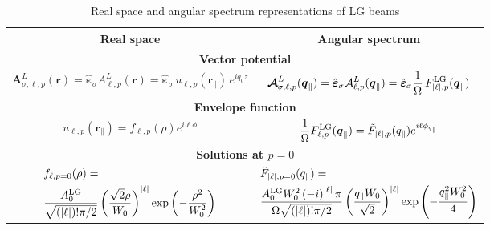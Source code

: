 \begin{table}[H]
\color{G}
\centering
\caption{Real space and angular spectrum representations of LG beams}
\label{tab:my_formulas}

\begin{tabular}{|c|c|}
\hline
\textbf{Real space} & \textbf{Angular spectrum} \\ \hline

\hline
\multicolumn{2}{|c|}{\textbf{Vector potential}} \\ \hline
\rule[-2.5ex]{0pt}{6.5ex} %
$\displaystyle \boldsymbol{A}^{L}_{\sigma, \ell, p}(\boldsymbol{r})
=
\hat{\boldsymbol{\varepsilon}}_\sigma A^{L}_{\ell, p}(\boldsymbol{r})
=
\hat{\boldsymbol{\varepsilon}}_\sigma
\, u_{\ell, p}(\boldsymbol{r}_\parallel)
\, e^{i q_0 z}$
&
$\displaystyle \boldsymbol{\mathcal{A}}^L_{\sigma, \ell, p}(\boldsymbol{q}_\parallel)
=
\hat{\boldsymbol{\varepsilon}}_\sigma \mathcal{A}^L_{\ell, p}(\boldsymbol{q}_\parallel)
=
\hat{\boldsymbol{\varepsilon}}_\sigma
\frac{1}{\Omega}
\, F_{|\ell|, p}^{\rm LG}(\boldsymbol{q}_\parallel)$ \\ \hline

\hline
\multicolumn{2}{|c|}{\textbf{Envelope function}} \\ \hline
\rule[-2.5ex]{0pt}{6.5ex}
$\displaystyle u_{\ell, p}(\boldsymbol{r}_\parallel)
=
f_{\ell, p}(\rho)e^{i \ell \phi}$
&
$\displaystyle \frac{1}{\Omega}F_{\ell, p}^{\rm LG}(\boldsymbol{q}_\parallel)
=
\tilde{F}_{\left|\ell\right|, p}(q_\parallel)e^{i \ell \phi_{q_\parallel}}$ \\ \hline

\hline
\multicolumn{2}{|c|}{\textbf{Solutions at $p=0$}} \\ \hline
\rule[-6ex]{0pt}{13ex} %
$\begin{aligned} 
&\displaystyle f_{\ell, p=0}(\rho) = \\
&\displaystyle \frac{A^{\rm LG}_0}{\sqrt{(|\ell|)!\pi/2}}
\left( \frac{\sqrt{2}\rho}{W_0} \right)^{|\ell|} \exp\left( -\frac{\rho^2}{W_0^2} \right)
\end{aligned}$
&
$\begin{aligned} 
&\displaystyle \tilde{F}_{\left|\ell\right|, p=0}(q_\parallel) = \\
& \displaystyle \frac{A^{\rm LG}_0 W_0^2 \left(-i\right)^{\left|\ell\right|}\pi}{\Omega\sqrt{(|\ell|)!\pi/2}}
 \left( \frac{q_{\parallel} W_0}{\sqrt{2}} \right)^{|\ell|} \exp\left( -\frac{q_{\parallel}^2 W_0^2}{4} \right)
\end{aligned}$ \\ \hline 

\end{tabular}
\end{table}
